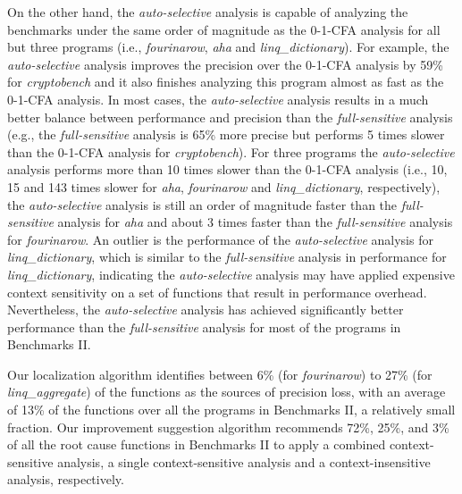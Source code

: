 
On the other hand, the {\it auto-selective} analysis is capable of analyzing the benchmarks under the same order of magnitude as the 0-1-CFA analysis for all but three programs (i.e., {\it fourinarow}, {\it aha} and {\it linq\_dictionary}). For example, the {\it auto-selective} analysis improves the precision over the 0-1-CFA analysis by 59\% for {\it cryptobench} and it also finishes analyzing this program almost as fast as the 0-1-CFA analysis. In most cases, the {\it auto-selective} analysis results in a much better balance between performance and precision than the {\it full-sensitive} analysis (e.g., the {\it full-sensitive} analysis is 65\% more precise but performs 5 times slower than the 0-1-CFA analysis for {\it cryptobench}). For three programs the {\it auto-selective} analysis performs more than 10 times slower than the 0-1-CFA analysis (i.e., 10, 15 and 143 times slower for {\it aha}, {\it fourinarow} and {\it linq\_dictionary}, respectively), the {\it auto-selective} analysis is still an order of magnitude faster than the {\it full-sensitive} analysis for {\it aha} and about 3 times faster than the {\it full-sensitive} analysis for {\it fourinarow}. An outlier is the performance of the {\it auto-selective} analysis for {\it linq\_dictionary}, which is similar to the {\it full-sensitive} analysis in performance for {\it linq\_dictionary}, indicating the {\it auto-selective} analysis may have applied expensive context sensitivity on a set of functions that result in performance overhead. Nevertheless, the {\it auto-selective} analysis has achieved significantly better performance than the {\it full-sensitive} analysis for most of the programs in Benchmarks II.

Our localization algorithm identifies between 6\% (for {\it fourinarow}) to 27\% (for {\it linq\_aggregate}) of the functions as the sources of precision loss, with an average of 13\% of the functions over all the programs in Benchmarks II, a relatively small fraction. Our improvement suggestion algorithm recommends 72\%, 25\%, and 3\% of all the root cause functions in Benchmarks II to apply a combined context-sensitive analysis, a single context-sensitive analysis and a context-insensitive analysis, respectively.

